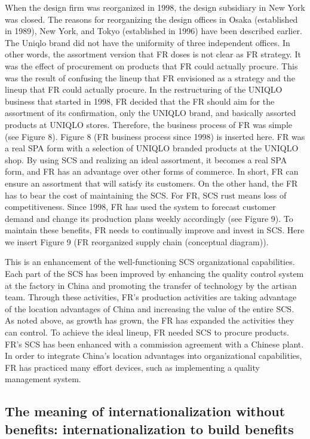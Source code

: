 \documentclass[12pt,]{article}
\begin{document}
When the design firm was reorganized in 1998, the design subsidiary in
New York was closed. The reasons for reorganizing the design offices in
Osaka (established in 1989), New York, and Tokyo (established in 1996)
have been described earlier. The Uniqlo brand did not have the
uniformity of three independent offices. In other words, the assortment
version that FR doses is not clear as FR strategy. It was the effect of
procurement on products that FR could actually procure. This was the
result of confusing the lineup that FR envisioned as a strategy and the
lineup that FR could actually procure. In the restructuring of the
UNIQLO business that started in 1998, FR decided that the FR should aim
for the assortment of its confirmation, only the UNIQLO brand, and
basically assorted products at UNIQLO stores. Therefore, the business
process of FR was simple (see Figure 8). Figure 8 (FR business process
since 1998) is inserted here. FR was a real SPA form with a selection of
UNIQLO branded products at the UNIQLO shop. By using SCS and realizing
an ideal assortment, it becomes a real SPA form, and FR has an advantage
over other forms of commerce. In short, FR can ensure an assortment that
will satisfy its customers. On the other hand, the FR has to bear the
cost of maintaining the SCS. For FR, SCS rust means loss of
competitiveness. Since 1998, FR has used the system to forecast customer
demand and change its production plans weekly accordingly (see Figure
9). To maintain these benefits, FR needs to continually improve and
invest in SCS. Here we insert Figure 9 (FR reorganized supply chain
(conceptual diagram)).

This is an enhancement of the well-functioning SCS organizational
capabilities. Each part of the SCS has been improved by enhancing the
quality control system at the factory in China and promoting the
transfer of technology by the artisan team. Through these activities,
FR's production activities are taking advantage of the location
advantages of China and increasing the value of the entire SCS. As noted
above, as growth has grown, the FR has expanded the activities they can
control. To achieve the ideal lineup, FR needed SCS to procure products.
FR's SCS has been enhanced with a commission agreement with a Chinese
plant. In order to integrate China's location advantages into
organizational capabilities, FR has practiced many effort devices, such
as implementing a quality management system.

\hypertarget{the-meaning-of-internationalization-without-benefits-internationalization-to-build-benefits}{%
\subsection{The meaning of internationalization without benefits:
internationalization to build
benefits}\label{the-meaning-of-internationalization-without-benefits-internationalization-to-build-benefits}}
\end{document}
